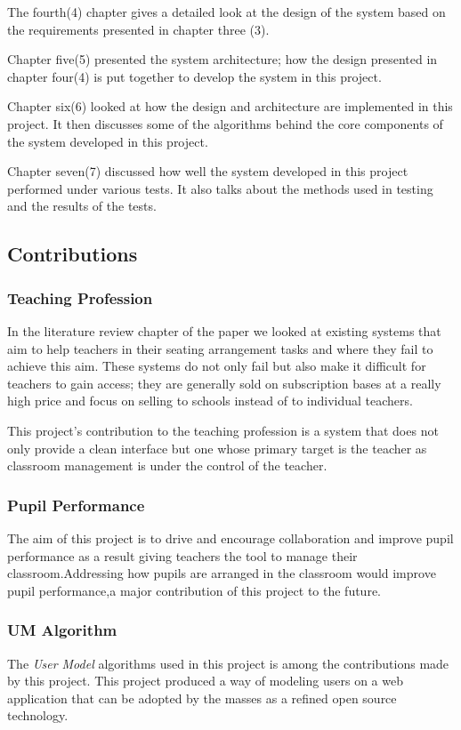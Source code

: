  The fourth(4) chapter gives a detailed look at the design of the system based on the requirements presented in chapter three (3). 
 
 Chapter five(5) presented the system architecture; how the design presented in chapter four(4) is put together to develop the system in this project.
 
 Chapter six(6) looked at how the design and architecture are implemented in this project. It then discusses some of the algorithms behind the core components of the system developed in this project.
 
 Chapter seven(7) discussed how well the system developed in this project performed under various tests. It also talks about the methods used in testing and the results of the tests.
\subsection{Contributions}
\subsubsection{Teaching Profession}
In the literature review chapter of the paper we looked at existing systems that aim to help teachers in their seating arrangement tasks and where they fail to achieve this aim. These systems do not only fail but also make it difficult for teachers to gain access; they are generally sold on subscription bases at a really high price and focus on selling to schools instead of to individual teachers.

This project's contribution to the teaching profession is a system that does not only provide a clean interface but one whose primary target is the teacher as classroom management is under the control of the teacher.  

\subsubsection{Pupil Performance}
The aim of this project is to drive and encourage collaboration and improve pupil performance as a result giving teachers the tool to manage their classroom.Addressing how pupils are arranged in the classroom would improve pupil performance,a major contribution of this project to the future.
\subsubsection{UM Algorithm}
The \emph{User Model} algorithms used in this project is among the contributions made by this project. This project produced a way of modeling users on a web application that can be adopted by the masses as a refined open source technology.
 
